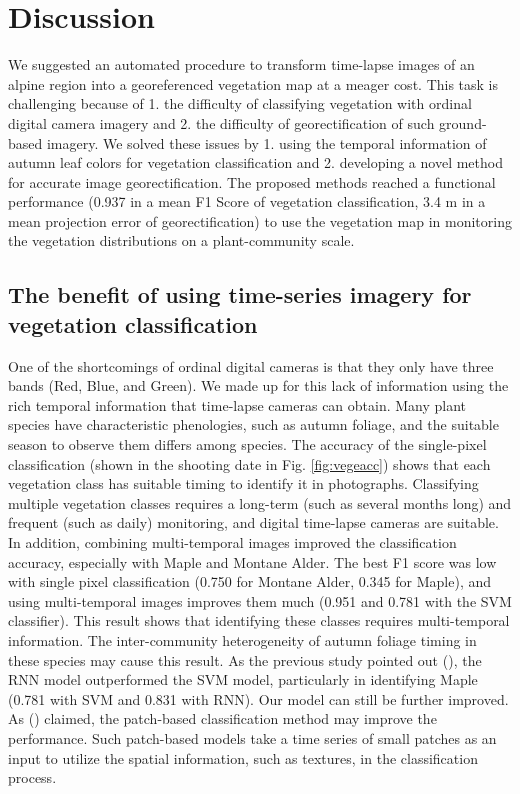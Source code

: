 \documentclass{article}
\begin{document}
\hypertarget{discussion}{%
\section{Discussion}\label{discussion}}

We suggested an automated procedure to transform time-lapse images of an alpine region into a georeferenced vegetation map at a meager cost. This task is challenging because of 1. the difficulty of classifying vegetation with ordinal digital camera imagery and 2. the difficulty of georectification of such ground-based imagery. We solved these issues by 1. using the temporal information of autumn leaf colors for vegetation classification and 2. developing a novel method for accurate image georectification. The proposed methods reached a functional performance (0.937 in a mean F1 Score of vegetation classification, 3.4 m in a mean projection error of georectification) to use the vegetation map in monitoring the vegetation distributions on a plant-community scale.

\hypertarget{the-benefit-of-using-time-series-imagery-for-vegetation-classification}{%
\subsection{The benefit of using time-series imagery for vegetation classification}\label{the-benefit-of-using-time-series-imagery-for-vegetation-classification}}

One of the shortcomings of ordinal digital cameras is that they only have three bands (Red, Blue, and Green). We made up for this lack of information using the rich temporal information that time-lapse cameras can obtain. Many plant species have characteristic phenologies, such as autumn foliage, and the suitable season to observe them differs among species. The accuracy of the single-pixel classification (shown in the shooting date in Fig. \ref{fig:vegeacc}) shows that each vegetation class has suitable timing to identify it in photographs. Classifying multiple vegetation classes requires a long-term (such as several months long) and frequent (such as daily) monitoring, and digital time-lapse cameras are suitable. In addition, combining multi-temporal images improved the classification accuracy, especially with Maple and Montane Alder. The best F1 score was low with single pixel classification (0.750 for Montane Alder, 0.345 for Maple), and using multi-temporal images improves them much (0.951 and 0.781 with the SVM classifier). This result shows that identifying these classes requires multi-temporal information. The inter-community heterogeneity of autumn foliage timing in these species may cause this result. As the previous study pointed out (\cite{Ienco2017RemSenLSTM}), the RNN model outperformed the SVM model, particularly in identifying Maple (0.781 with SVM and 0.831 with RNN). Our model can still be further improved. As (\cite{Sharma2018NN}) claimed, the patch-based classification method may improve the performance. Such patch-based models take a time series of small patches as an input to utilize the spatial information, such as textures, in the classification process.
\end{document}

